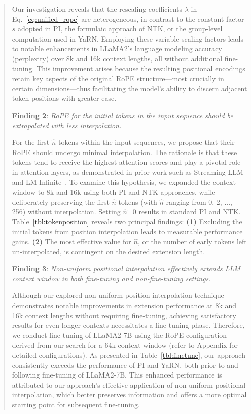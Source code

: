 \begin{abstract}
Our investigation reveals that the rescaling coefficients $\lambda$ in Eq.~\ref{eq:unified_rope} are heterogeneous, in contrast to the constant factor $s$ adopted in PI, the formulaic approach of NTK, or the group-level computation used in YaRN. Employing these variable scaling factors leads to notable enhancements in LLaMA2’s language modeling accuracy (perplexity) over 8k and 16k context lengths, all without additional fine-tuning. This improvement arises because the resulting positional encodings retain key aspects of the original RoPE structure—most crucially in certain dimensions—thus facilitating the model's ability to discern adjacent token positions with greater ease.

\textbf{Finding 2}: \textit{RoPE for the initial tokens in the input sequence should be extrapolated with less interpolation.} 

For the first $\hat{n}$ tokens within the input sequences, we propose that their RoPE should undergo minimal interpolation. The rationale is that these tokens tend to receive the highest attention scores and play a pivotal role in attention layers, as demonstrated in prior work such as Streaming LLM~\cite{streamingllm} and LM-Infinite~\cite{han2023lminfinite}. To examine this hypothesis, we expanded the context window to 8k and 16k using both PI and NTK approaches, while deliberately preserving the first $\hat n$ tokens (with $\hat n$ ranging from 0, 2, ..., 256) without interpolation. Setting $\hat n$=0 results in standard PI and NTK. Table~\ref{tbl:tokenposition} reveals two principal findings: \textbf{(1)} Excluding the initial tokens from position interpolation leads to measurable performance gains. \textbf{(2)} The most effective value for $\hat n$, or the number of early tokens left un-interpolated, is contingent on the desired extension length.

\textbf{Finding 3}: \textit{Non-uniform positional interpolation effectively extends LLM context window in both fine-tuning and non-fine-tuning settings.} 

Although our explored non-uniform position interpolation technique demonstrates notable improvements in extension performance at 8k and 16k context lengths without requiring fine-tuning, achieving satisfactory results for even longer contexts necessitates a fine-tuning phase. Therefore, we conduct fine-tuning of LLaMA2-7B using the RoPE configuration derived from our search for a 64k context window (refer to Appendix for detailed configurations). As presented in Table~\ref{tbl:finetune}, our approach consistently exceeds the performance of PI and YaRN, both prior to and following fine-tuning of LLaMA2-7B. This enhanced performance is attributed to our approach’s effective application of non-uniform positional interpolation, which better preserves information and offers a more optimal starting point for subsequent fine-tuning.


\end{abstract}
